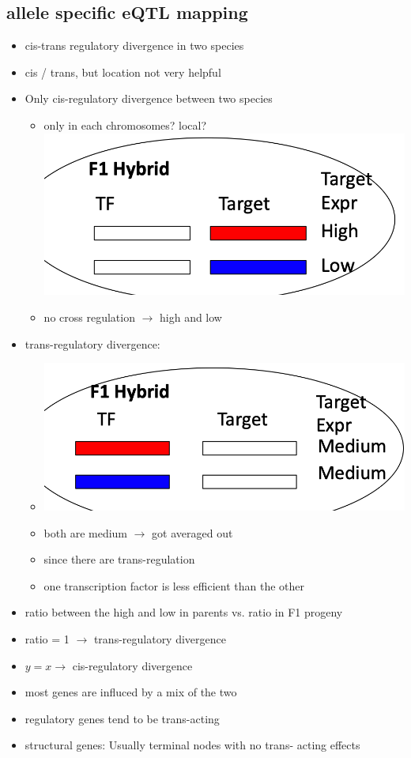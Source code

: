 \documentclass[font=12pt]{article}
\begin{document}
\subsection{allele specific eQTL mapping}
\begin{itemize}
	\item cis-trans regulatory divergence in two species
	\item cis / trans, but location not very helpful
	\item Only cis-regulatory divergence between two species
	\begin{itemize}
		\item only in each chromosomes? local?\includegraphics[width=0.5\linewidth]{cis-regulatory}
		\item no cross regulation $\to$ high and low
	\end{itemize}
	\item trans-regulatory divergence:
	\begin{itemize}
		\item \includegraphics[width=0.5\linewidth]{trans-regulatory}
		\item both are medium $\to$ got averaged out
		\item since there are trans-regulation
		\item one transcription factor is less efficient than the other
	\end{itemize}
	\item ratio between the high and low in parents vs. ratio in F1 progeny
	\item ratio = 1 $\to$ trans-regulatory divergence
	\item $ y = x \to $ cis-regulatory divergence
	\item most genes are influced by a mix of the two
	\item regulatory genes tend to be trans-acting
	\item structural genes: Usually terminal nodes with no trans- acting effects
\end{itemize}
\end{document}
